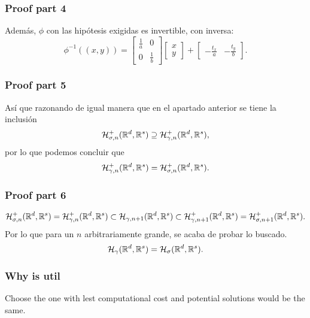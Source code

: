 \begin{frame}
    \frametitle{Proof part 4}

    Además, $\phi$ con las hipótesis exigidas es
    invertible, con inversa: 
    \begin{equation}
        \phi^{-1}((x,y)) =  
        \begin{bmatrix}
            \frac{1}{a} & 0 \\
             0& \frac{1}{b} 
        \end{bmatrix}
        \begin{bmatrix}
            x \\
            y
        \end{bmatrix}
        +
        \begin{bmatrix}
            - \frac{t_x}{a}  &  - \frac{t_y}{b}
        \end{bmatrix}.
    \end{equation}
    
\end{frame}
\begin{frame}
    \frametitle{Proof part 5}

    Así que razonando de igual manera que en el 
    apartado anterior se tiene la inclusión
    \begin{equation}
        \mathcal{H}^+_{\sigma, n}(\mathbb{R}^d, \mathbb{R}^s)
        \supseteq
        \mathcal{H}^+_{\gamma, n}(\mathbb{R}^d, \mathbb{R}^s),  
    \end{equation}
    por lo que podemos concluir que 
    \begin{equation*}
        \mathcal{H}^+_{\gamma, n}(\mathbb{R}^d, \mathbb{R}^s) 
        = 
        \mathcal{H}^+_{\sigma, n}(\mathbb{R}^d, \mathbb{R}^s).
    \end{equation*}
 
\end{frame}

\begin{frame}
    \frametitle{Proof part 6}

    
    \begin{equation*}
        \mathcal{H}^+_{\sigma, n}(\mathbb{R}^d, \mathbb{R}^s) = \mathcal{H}^+_{\gamma, n}(\mathbb{R}^d, \mathbb{R}^s) 
        \subset 
            \mathcal{H}_{\gamma, n+1}(\mathbb{R}^d, \mathbb{R}^s) 
        \subset
        \mathcal{H}^+_{\gamma, {n+1}}(\mathbb{R}^d, \mathbb{R}^s) = \mathcal{H}^+_{\sigma, {n+1}}(\mathbb{R}^d, \mathbb{R}^s) 
        .
    \end{equation*}
    Por lo que para un $n$ arbitrariamente grande, se acaba de probar lo buscado. 
    \begin{equation*}
        \mathcal{H}_{\gamma}(\mathbb{R}^d, \mathbb{R}^s) = \mathcal{H}_{\sigma}(\mathbb{R}^d, \mathbb{R}^s).
    \end{equation*}


\end{frame}

\begin{frame}
    \frametitle{Why is util}
    Choose the one with lest computational cost and
    potential solutions would be the same. 
\end{frame}

